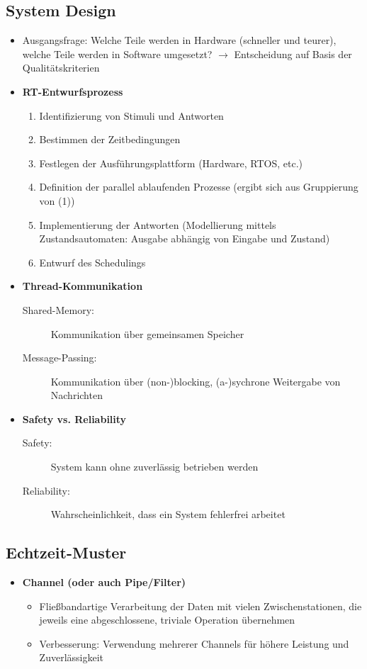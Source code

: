 \subsection{System Design}
\begin{itemize}
	\item Ausgangsfrage: Welche Teile werden in Hardware (schneller und teurer), welche Teile werden in Software umgesetzt? \(\rightarrow\) Entscheidung auf Basis der Qualitätskriterien
	\item \textbf{RT-Entwurfsprozess}
	\begin{enumerate}
		\item Identifizierung von Stimuli und Antworten
		\item Bestimmen der Zeitbedingungen
		\item Festlegen der Ausführungsplattform (Hardware, RTOS, etc.)
		\item Definition der parallel ablaufenden Prozesse (ergibt sich aus Gruppierung von (1))
		\item Implementierung der Antworten (Modellierung mittels Zustandsautomaten: Ausgabe abhängig von Eingabe und Zustand)
		\item Entwurf des Schedulings
	\end{enumerate}
	\item \textbf{Thread-Kommunikation}
	\begin{description}
		\item[Shared-Memory:] Kommunikation über gemeinsamen Speicher
		\item [Message-Passing:] Kommunikation über (non-)blocking, (a-)sychrone Weitergabe von Nachrichten
	\end{description}
	\item \textbf{Safety vs. Reliability} %
	\begin{description}
		\item[Safety:] System kann ohne zuverlässig betrieben werden
		\item[Reliability:] Wahrscheinlichkeit, dass ein System fehlerfrei arbeitet
	\end{description}
\end{itemize}


\subsection{Echtzeit-Muster}
\begin{itemize}
	\item \textbf{Channel (oder auch Pipe/Filter)}
	\begin{itemize}
		\item Fließbandartige Verarbeitung der Daten mit vielen Zwischenstationen, die jeweils eine abgeschlossene, triviale Operation übernehmen
		\item Verbesserung: Verwendung mehrerer Channels für höhere Leistung und Zuverlässigkeit
	\end{itemize}
\end{itemize}